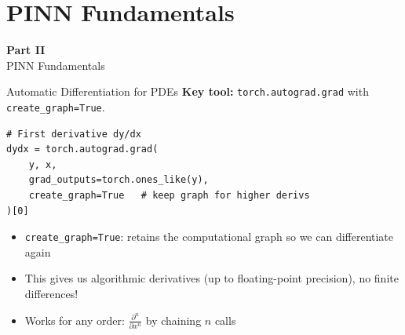 \documentclass[aspectratio=169,11pt]{beamer}
\newcommand{\emphc}[1]{\textcolor{harvardcrimson}{#1}}
\begin{document}

\section{PINN Fundamentals}

\begin{frame}{}
\vfill
\begin{center}
{\Huge \textcolor{uzhblue}{\textbf{Part II}}}\\[12pt]
{\LARGE PINN Fundamentals}
\end{center}
\vfill
\end{frame}

\begin{frame}[fragile]{Automatic Differentiation for PDEs}
\textbf{Key tool:} \texttt{torch.autograd.grad} with \texttt{create\_graph=True}.

\vspace{0.4em}
\begin{lstlisting}
# First derivative dy/dx
dydx = torch.autograd.grad(
    y, x,
    grad_outputs=torch.ones_like(y),
    create_graph=True   # keep graph for higher derivs
)[0]
\end{lstlisting}

\vspace{0.3em}
\begin{itemize}
    \item \texttt{create\_graph=True}: retains the computational graph so we can differentiate \emphc{again}
    \item This gives us \emphc{algorithmic} derivatives (up to floating-point precision), no finite differences!
    \item Works for \emphc{any order}: $\frac{\partial^n}{\partial x^n}$ by chaining $n$ calls
\end{itemize}
\end{frame}
\end{document}
